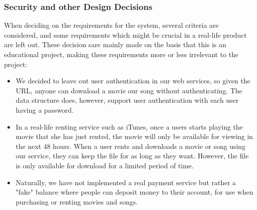 \subsubsection{Security and other Design Decisions}
When deciding on the requirements for the system, several criteria are considered, and some requirements which might be crucial in a real-life product are left out. These decision sare mainly made on the basis that this is an educational project, making these requirements more or less irrelevant to the project:
\begin{itemize}
\item We decided to leave out user authentication in our web services, so given the URL, anyone can download a movie our song without authenticating. The data structure does, however, support user authentication with each user having a password.
\item In a real-life renting service such as iTunes, once a users starts playing the movie that she has just rented, the movie will only be available for viewing in the next 48 hours. When a user rents and downloads a movie or song using our service, they can keep the file for as long as they want. However, the file is only available for download for a limited period of time.
\item Naturally, we have not implemented a real payment service but rather a "fake" balance where people can deposit money to their account, for use when purchasing or renting movies and songs.
\end{itemize}